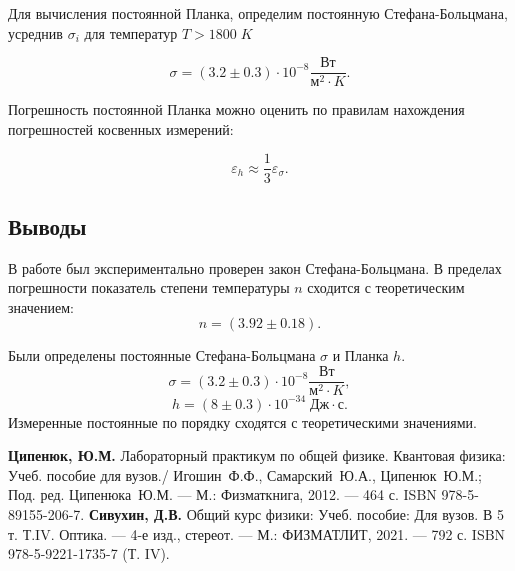 \documentclass[10pt,a4paper]{article}
\begin{document}
\begin{multicols}{2}
	Для вычисления постоянной Планка, определим постоянную Стефана-Больцмана, усреднив $\sigma_i$ для температур $T > 1800\; K$
	
	$$ \sigma = (3.2 \pm 0.3) \cdot 10^{-8} \frac{\text{Вт}}{\text{м}^2 \cdot K}.$$
	
	Погрешность постоянной Планка можно оценить по правилам нахождения погрешностей косвенных измерений:
	
	$$\varepsilon_h \approx \frac{1}{3} \varepsilon_\sigma.$$

	\subsection*{Выводы}
	
	В работе был экспериментально проверен закон Стефана-Больцмана. В пределах погрешности показатель степени температуры $n$ сходится с теоретическим значением:
	$$
	n = (3.92 \pm 0.18).
	$$
	
	Были определены постоянные Стефана-Больцмана $\sigma$ и Планка $h$. 
	$$
	\sigma = (3.2 \pm 0.3) \cdot 10^{-8} \frac{\text{Вт}}{\text{м}^2 \cdot K},$$ 
	$$h = (8 \pm 0.3) \cdot 10^{-34}\; \text{Дж} \cdot \text{с}.$$
	Измеренные постоянные по порядку сходятся с теоретическими значениями.
	
	\begin{thebibliography}{}
		 \textbf{Ципенюк, Ю.М.} Лабораторный практикум по общей физике. Квантовая физика: Учеб. пособие для вузов./ Игошин~Ф.Ф., Самарский~Ю.А., Ципенюк~Ю.М.; Под. ред. Ципенюка~Ю.М. --- М.: Физматкнига, 2012. --- 464 с. ISBN 978-5-89155-206-7.
		 \textbf{Сивухин, Д.В.} Общий курс физики: Учеб. пособие: Для вузов. В 5 т. Т.IV. Оптика. --- 4-е изд., стереот. --- М.: ФИЗМАТЛИТ, 2021. --- 792 с. ISBN 978-5-9221-1735-7 (Т. IV).
	\end{thebibliography}
\end{multicols}
\end{document}
